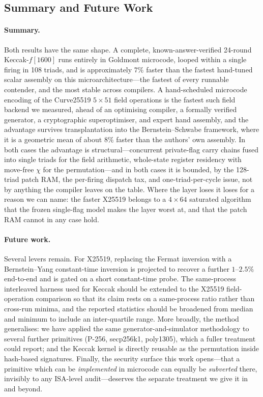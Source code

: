 \subsection{Summary and Future Work}
\label{sec:results-future}

\paragraph{Summary.}
Both results have the same shape. A complete, known-answer-verified 24-round
Keccak-$f[1600]$ runs entirely in Goldmont microcode, looped within a single
firing in 108 triads, and is approximately $7\%$ faster than the fastest
hand-tuned scalar assembly on this microarchitecture---the fastest of every
runnable contender, and the most stable across compilers. A hand-scheduled
microcode encoding of the Curve25519 $5\times51$ field operations is the fastest
such field backend we measured, ahead of an optimising compiler, a formally
verified generator, a cryptographic superoptimiser, and expert hand assembly, and
the advantage survives transplantation into the Bernstein--Schwabe framework,
where it is a geometric mean of about $8\%$ faster than the authors' own assembly.
In both cases the advantage is structural---concurrent private-flag carry chains
fused into single triads for the field arithmetic, whole-state register residency
with move-free $\chi$ for the permutation---and in both cases it is bounded, by the
128-triad patch RAM, the per-firing dispatch tax, and one-triad-per-cycle issue,
not by anything the compiler leaves on the table. Where the layer loses it loses
for a reason we can name: the faster X25519 belongs to a $4\times64$ saturated
algorithm that the frozen single-flag model makes the layer worst at, and that the
patch RAM cannot in any case hold.

\paragraph{Future work.}
Several levers remain. For X25519, replacing the Fermat inversion with a
Bernstein--Yang constant-time inversion is projected to recover a further
$1$--$2.5\%$ end-to-end and is gated on a short constant-time probe. The
same-process interleaved harness used for Keccak should be extended to the
X25519 field-operation comparison so that its claim rests on a same-process ratio
rather than cross-run minima, and the reported statistics should be broadened from
median and minimum to include an inter-quartile range. More broadly, the method
generalises: we have applied the same generator-and-simulator methodology to
several further primitives (P-256, secp256k1, poly1305), which a fuller treatment
could report; and the Keccak kernel is directly reusable as the permutation inside
hash-based signatures. Finally, the security surface this work opens---that a
primitive which can be \emph{implemented} in microcode can equally be
\emph{subverted} there, invisibly to any ISA-level audit---deserves the separate
treatment we give it in  and beyond.
